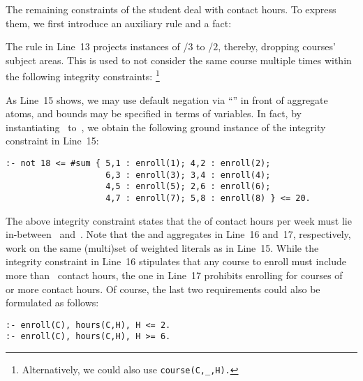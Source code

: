 \begin{example}
The remaining constraints of the student deal with contact hours.
To express them, we first introduce an auxiliary rule and a fact:
%

%
The rule in Line~13 projects instances of /$3$ to
/$2$, thereby, dropping courses' subject areas.
This is used to not consider the same course multiple times within the following
integrity constraints:
\footnote{Alternatively, we could also use \lstinline{course(C,_,H).}}
%

%
As Line~15 shows,
we may use default negation via ``'' in front of aggregate atoms,
and bounds may be specified in terms of variables.
In fact, by instantiating~ to~,
we obtain the following ground instance of the integrity constraint in Line~15:
%
\begin{lstlisting}[firstnumber=15,stepnumber=15]
:- not 18 <= #sum { 5,1 : enroll(1); 4,2 : enroll(2);
                    6,3 : enroll(3); 3,4 : enroll(4);
                    4,5 : enroll(5); 2,6 : enroll(6);
                    4,7 : enroll(7); 5,8 : enroll(8) } <= 20.
\end{lstlisting}
%
The above integrity constraint states that the  of contact hours per week
must lie in-between~ and~.
Note that the  and  aggregates in Line~16 and~17, respectively,
work on the same (multi)set  of weighted literals as in Line~15.
While the integrity constraint in Line~16 stipulates that any course to enroll
must include more than~ contact hours,
the one in Line~17 prohibits enrolling for courses of~ or more contact hours.
Of course, the last two requirements could also be formulated as follows:
%
\begin{lstlisting}[firstnumber=16]
:- enroll(C), hours(C,H), H <= 2.
:- enroll(C), hours(C,H), H >= 6.
\end{lstlisting}


\end{example}
